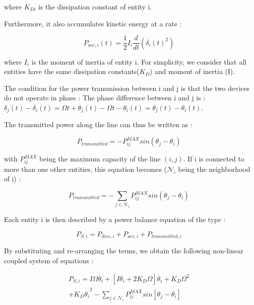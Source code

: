 \documentclass[conference]{IEEEtran}
\begin{document}
where $ K_{Di} $ is the dissipation constant of entity i.

Furthermore, it also accumulates kinetic energy at a rate : 

\begin{equation} 
P_{acc,i}(t) = \frac{1}{2}I_i\frac{d}{dt} \left( \dot{ \delta_i }(t)^2 \right)
\end{equation} 

where $ I_{i}$ is the moment of inertia of entity i. For simplicity, we consider that all entities have the same dissipation constants($K_D$) and moment of inertia (I).

The condition for the power transmission between i and j is that the two devices do not operate in phase : The phase difference between i and j is : $ \delta_j(t) - \delta_i(t) = \Omega t + \theta_j(t) - \Omega t - \theta_i(t) = \theta_j(t) - \theta_i(t) $.

The transmitted power along the line can thus be written as : 

\begin{equation}
 P_{transmitted} = - P_{ij}^{MAX} sin( \theta_j - \theta_i )
\end{equation}
  
with $ P_{ij}^{MAX} $ being the maximum capacity of the line $(i,j)$. If i is connected to more than one other entities, this equation becomes ($\mathcal{N}_i$ being the neighborhood of  i) : 

\begin{equation}
  P_{transmitted} = - \sum_{j \in \mathcal{N}_i} P_{ij}^{MAX} sin( \theta_j - \theta_i ) 
\end{equation}


Each entity i is then described by a power balance equation of the type :

\begin{equation}
 P_{S,i}  =  P_{diss,i} + P_{acc,i} + P_{transmitted,i} 
\end{equation}

By substituting and re-arranging the terms, we obtain the following non-linear coupled system of equations :

\begin{equation}
\begin{array}{lll}
P_{S, i}  =  I \Omega \ddot{ \theta_i }  + \left[ I \ddot{ \theta_i } + 2 K_D \Omega \right] \dot{ \theta_i } + K_D \Omega^2 \\+ K_D \dot{ \theta_i }^2 - \sum_{j \in \mathcal{N}_i} P_{ij}^{MAX} sin \left[ \theta_j - \theta_i \right] \end{array}
\end{equation}
\end{document}

